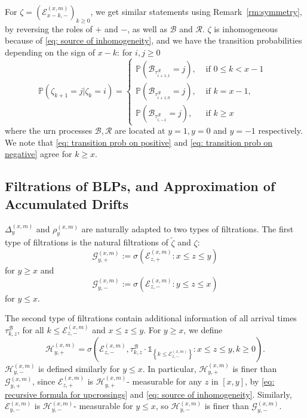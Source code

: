 \documentclass[EJP]{ejpecp} %
\begin{document}
For $\zeta= \left(\mathcal{E}^{(x,m)}_{x-k,-} \right)_{k\geq 0}$, we get similar statements using Remark~\ref{rm:symmetry}, by reversing the roles of $+$ and $-$, as well as $\mathscr{B}$ and $\mathscr{R}$. $\zeta$ is inhomogeneous because of \eqref{eq: source of inhomogeneity}, and we have the transition probabilities depending on the sign of $x-k$: for $i,j\geq 0$
\begin{equation}\label{eq: transition prob on negative}
	\mathbb{P}\left(\zeta_{k+1}=j \vert \zeta_k =i  \right) = 
	\begin{cases}
		\mathbb{P}\left( \mathscr{B}_{\tau_{i+1,1}^{\mathscr{R}}} = j \right) ,& \mbox{ if $0 \leq k <  x-1$ }
		\\
		\mathbb{P}\left( \mathscr{B}_{\tau_{i+1,0}^{\mathscr{R}}} = j \right) ,& \mbox{ if $k =  x-1$, }
		\\
		\mathbb{P}\left( \mathscr{B}_{\tau_{i,-1}^{\mathscr{R}}} = j \right) ,& \mbox{ if $k \geq x$ }
	\end{cases}
\end{equation}
where the urn processes $\mathscr{B}, \mathscr{R}$ are located at $y = 1, y=0$ and $y = -1$ respectively. We note that \eqref{eq: transition prob on positive} and \eqref{eq: transition prob on negative} agree for $k \ge x$.


\subsection{Filtrations of BLPs, and Approximation of Accumulated Drifts}\label{subsec: measurability}

$\Delta^{(x,m)}_{y}$ and $\rho^{(x,m)}_{y}$ are naturally adapted to two types of filtrations. The first type of filtrations is the natural filtrations of $\tilde{\zeta}$ and $\zeta$: 
$$\mathcal{G}_{y, +}^{(x,m)}:=\sigma\left(\mathcal{E}^{(x,m)}_{z, +}: x \le z \le y\right) $$ for $y \ge x$ and $$\mathcal{G}_{y, -}^{(x,m)}:=\sigma\left(\mathcal{E}^{(x,m)}_{z, -}: y \le z \le x\right) $$ for $y \le x$.

The second type of filtrations contain additional information of all arrival times $\tau^\mathscr{B}_{k,z}$, for all $k\leq \mathcal{E}^{(x,m)}_{z, -}$ and $x\leq z \leq y$.
For $y \ge x$, we define
\[
\mathcal{H}_{y, +}^{(x,m)} = \sigma\left( \mathcal{E}_{z, -}^{(x,m)}, \tau_{k, z}^\mathscr{B}\cdot \mathbb{1}_{\left\{ k\leq \mathcal{E}_{z, -}^{(x,m)} \right\}} : x \leq  z \leq y,  k \geq 0 \right) 
.\]
$\mathcal{H}_{y, -}^{(x,m)}$ is defined similarly for $y\leq x$.
In particular, $\mathcal{H}_{y, +}^{(x,m)}$ is finer than $\mathcal{G}_{y, +}^{(x,m)}$, since $\mathcal{E}_{z, +}^{(x,m)}$ is $\mathcal{H}_{y, +}^{(x,m)}$- measurable for any $z$ in $[x,y]$, by \eqref{eq: recursive formula for upcrossings} and \eqref{eq: source of inhomogeneity}. Similarly, $\mathcal{E}_{y, -}^{(x,m)}$ is $\mathcal{H}_{y, -}^{(x,m)}$- measurable for $ y\leq x$, so $\mathcal{H}_{y, -}^{(x,m)}$ is finer than $\mathcal{G}_{y, -}^{(x,m)}$. 
\end{document}
